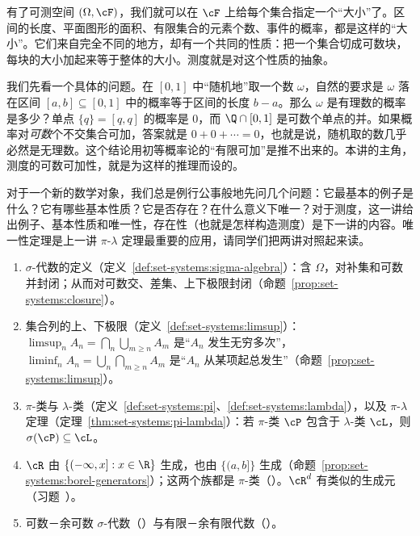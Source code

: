 \label{lec:measures}

有了可测空间 $(\Omega,\cF)$，我们就可以在 $\cF$ 上给每个集合指定一个“大小”了。区间的长度、平面图形的面积、有限集合的元素个数、事件的概率，都是这样的“大小”。它们来自完全不同的地方，却有一个共同的性质：把一个集合切成可数块，每块的大小加起来等于整体的大小。测度就是对这个性质的抽象。

我们先看一个具体的问题。在 $[0,1]$ 中“随机地”取一个数 $\omega$，自然的要求是 $\omega$ 落在区间 $[a,b]\subseteq[0,1]$ 中的概率等于区间的长度 $b-a$。那么 $\omega$ 是有理数的概率是多少？单点 $\{q\}=[q,q]$ 的概率是 $0$，而 $\Q\cap[0,1]$ 是可数个单点的并。如果概率对\emph{可数}个不交集合可加，答案就是 $0+0+\cdots=0$，也就是说，随机取的数几乎必然是无理数。这个结论用初等概率论的“有限可加”是推不出来的。本讲的主角，测度的可数可加性，就是为这样的推理而设的。

对于一个新的数学对象，我们总是例行公事般地先问几个问题：它最基本的例子是什么？它有哪些基本性质？它是否存在？在什么意义下唯一？对于测度，这一讲给出例子、基本性质和唯一性，存在性（也就是怎样构造测度）是下一讲的内容。唯一性定理是上一讲 $\pi$-$\lambda$ 定理最重要的应用，请同学们把两讲对照起来读。


\begin{enumerate}
\item $\sigma$-代数的定义（定义~\ref{def:set-systems:sigma-algebra}）：含 $\Omega$，对补集和可数并封闭；从而对可数交、差集、上下极限封闭（命题~\ref{prop:set-systems:closure}）。
\item 集合列的上、下极限（定义~\ref{def:set-systems:limsup}）：$\limsup_nA_n=\bigcap_n\bigcup_{m\geqslant n}A_m$ 是“$A_n$ 发生无穷多次”，$\liminf_nA_n=\bigcup_n\bigcap_{m\geqslant n}A_m$ 是“$A_n$ 从某项起总发生”（命题~\ref{prop:set-systems:limsup}）。
\item $\pi$-类与 $\lambda$-类（定义~\ref{def:set-systems:pi}、\ref{def:set-systems:lambda}），以及 $\pi$-$\lambda$ 定理（定理~\ref{thm:set-systems:pi-lambda}）：若 $\pi$-类 $\cP$ 包含于 $\lambda$-类 $\cL$，则 $\sigma(\cP)\subseteq\cL$。
\item $\cR$ 由 $\{(-\infty,x]:x\in\R\}$ 生成，也由 $\{(a,b]\}$ 生成（命题~\ref{prop:set-systems:borel-generators}）；这两个族都是 $\pi$-类（）。$\cR^d$ 有类似的生成元（习题~）。
\item 可数－余可数 $\sigma$-代数（）与有限－余有限代数（）。
\end{enumerate}

